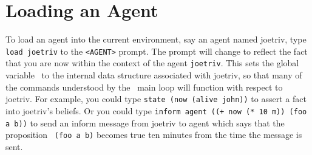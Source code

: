 \section{Loading an Agent}

To load an agent into the current environment, say an agent named
joetriv, type {\tt load joetriv} to the {\tt <AGENT>} prompt.  The
prompt will change to reflect the fact that you are now within the
context of the agent {\tt joetriv}.  This sets the global variable
\ca\ to the internal data structure associated with joetriv, so that
many of the commands understood by the \ao\ main loop will function
with respect to joetriv.  For example, you could type {\tt state (now
(alive john))} to assert a fact into joetriv's beliefs.  Or you could
type {\tt inform agent ((+ now (* 10 m)) (foo a b))} to send an inform
message from joetriv to agent which says that the proposition {\tt
(foo a b)} becomes true ten minutes from the time the message is sent.

